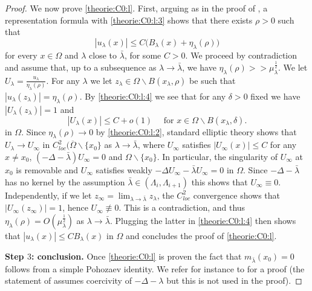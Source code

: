 \documentclass[10pt]{amsart}
\numberwithin{equation}{section}
\newcommand{\Om}{\Omega}
\def \xl{x_\lambda}
\theoremstyle{plain}
\theoremstyle{remark}
\begin{document}
\begin{proof}
We now prove \eqref{theorie:C0:l}. First, arguing as in the proof of \cite[Proposition 2.4]{CheikhAliPremoselli}, a representation formula with \eqref{theorie:C0:l:3} shows that there exists $\rho >0$ such that 
\begin{equation} \label{theorie:C0:l:4}
 |u_\lambda(x)| \le C \big( B_\lambda(x) + \eta_\lambda(\rho) \big) 
 \end{equation}
for every $x \in \Om$ and $\lambda$ close to $\bar{\lambda}$, for some $C >0$. We proceed by contradiction and assume that, up to a subsequence as $\lambda \to \bar{\lambda}$, we have  $\eta_\lambda(\rho) >> \mu_\lambda^{\frac12}$. We let  $U_\lambda = \frac{u_\lambda}{\eta_\lambda(\rho)}$. For any $\lambda$ we let $z_\lambda \in \Om\backslash B(\xl , \rho)$ be such that $|u_\lambda(z_\lambda)| = \eta_\lambda(\rho)$. By \eqref{theorie:C0:l:4} we see that for any $\delta >0$ fixed we have $|U_\lambda(z_\lambda)|=1$ and 
\begin{equation*}
|U_\lambda(x)| \le C + o(1) \quad \text{ for } x \in \Om \backslash B(\xl, \delta). 
\end{equation*}
in $\Om$. Since $\eta_\lambda(\rho) \to 0$ by  \eqref{theorie:C0:l:2}, standard elliptic theory shows that $U_\lambda \to U_\infty$ in $C^2_{loc}(\overline{\Om} \backslash \{x_0\}$ as $\lambda \to \bar{\lambda}$, where $U_\infty$ satisfies $|U_\infty(x)| \le C$ for any $x \neq x_0$, $(- \Delta - \bar{\lambda})U_\infty = 0$ and $ \Om \backslash \{x_0\}$.  In particular, the singularity of $U_\infty$ at $x_0$ is removable and $U_\infty$ satisfies weakly $-\Delta U_\infty - \bar{\lambda} U_\infty  =0$ in $\Om$. Since $- \Delta - \bar{\lambda}$ has no kernel by the assumption $\bar{\lambda} \in (\Lambda_i, \Lambda_{i+1})$ this shows that $U_\infty \equiv 0$. Independently, if we let $z_\infty = \lim_{\lambda \to \bar{\lambda}} z_\lambda$, the $C^2_{loc}$ convergence shows that $|U_\infty(z_\infty)| = 1$, hence $U_\infty \not \equiv 0$. This is a contradiction, and thus $\eta_\lambda(\rho) = O( \mu_\lambda^{\frac12})$ as $\lambda \to \bar{\lambda}$. Plugging the latter in \eqref{theorie:C0:l:4} then shows that $ |u_\lambda(x)| \le C B_\lambda(x) $ in $\Om$ and concludes the proof of \eqref{theorie:C0:l}.



\medskip

\textbf{Step $3$: conclusion.} Once \eqref{theorie:C0:l} is proven the fact that $m_{\bar{\lambda}}(x_0) = 0$ follows from a simple Pohozaev identity. We refer for instance to \cite[Proposition 3.1]{CheikhAliPremoselli} for a proof (the statement of \cite[Proposition 3.1]{CheikhAliPremoselli} assumes coercivity of $-\Delta - \lambda$ but this is not used in the proof).
\end{proof}
\end{document}
